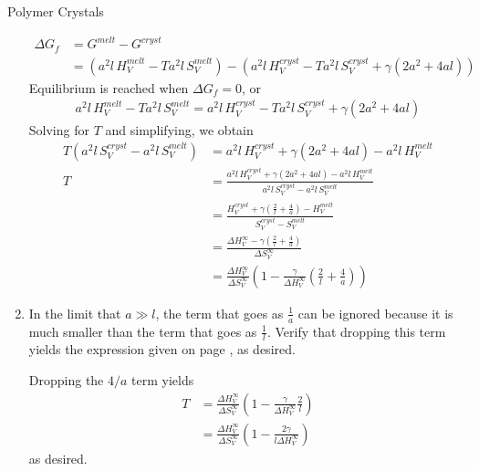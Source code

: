 \begin{activity}{Polymer Crystals}
\begin{exercises}
\begin{enumerate}
				\begin{solution}{}
					\begin{align*}
						\Delta G_f &= G^{melt} - G^{cryst} \\
						&= (a^2 l\,H_V^{melt} -T a^2 l\, S_V^{melt}) - (a^2 l\,H_V^{cryst} -T a^2 l\, S_V^{cryst} + \gamma (2a^2 + 4 al))
					\end{align*}
					Equilibrium is reached when $\Delta G_f = 0$, or
					\begin{align*}
						a^2 l\,H_V^{melt} -T a^2 l\, S_V^{melt} = a^2 l\,H_V^{cryst} -T a^2 l\, S_V^{cryst} + \gamma (2a^2 + 4 al)
					\end{align*}
					Solving for $T$ and simplifying, we obtain
					\begin{align*}
						T (a^2 l\, S_V^{cryst} - a^2 l\, S_V^{melt}) &= a^2 l\,H_V^{cryst} + \gamma (2a^2 + 4 al) - a^2 l\,H_V^{melt}\\
						T &= \frac{a^2 l\,H_V^{cryst} + \gamma (2a^2 + 4 al) - a^2 l\,H_V^{melt}}{a^2 l\, S_V^{cryst} - a^2 l\, S_V^{melt}}\\
						 &= \frac{H_V^{cryst} + \gamma (\frac{2}{l} + \frac{4}{a}) - H_V^{melt}}{S_V^{cryst} - S_V^{melt}} \\
						 &= \frac{\Delta H_V^\infty - \gamma\left(\frac{2}{l} + \frac{4}{a}\right)}{\Delta S_V^\infty} \\
						 &= \frac{\Delta H_V^\infty}{\Delta S_V^\infty}\left(1-\frac{\gamma}{\Delta H_V^\infty}\left(\frac{2}{l} + \frac{4}{a}\right)\right)
					\end{align*}
				\end{solution}
			
			\item In the limit that $a \gg l$, the term that goes as $\frac{1}{a}$ can be ignored because it is much smaller than the term that goes as $\frac{1}{l}$.  Verify that dropping this term yields the expression given on page \pageref{\labelbase:info:lamellaeTmelt}, as desired.
			
				\begin{solution}{}
					Dropping the $4/a$ term yields
					\begin{align*}
						T &= \frac{\Delta H_V^\infty}{\Delta S_V^\infty}\left(1-\frac{\gamma}{\Delta H_V^\infty}\frac{2}{l}\right) \\
						 &= \frac{\Delta H_V^\infty}{\Delta S_V^\infty}\left(1-\frac{2\gamma}{l\Delta H_V^\infty}\right)
					\end{align*}
					as desired.
				\end{solution}
			
		\end{enumerate}
	
\end{exercises}


%
%	


	
\end{activity}